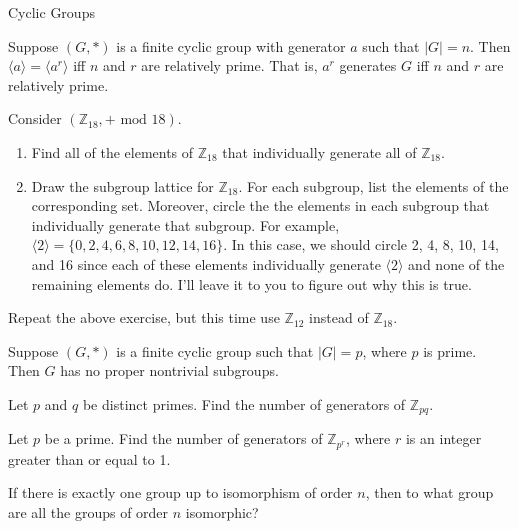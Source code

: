 \begin{section}{Cyclic Groups}
\begin{corollary}
Suppose $(G,*)$ is a finite cyclic group with generator $a$ such that $|G|=n$. Then $\langle a\rangle=\langle a^r\rangle$ iff $n$ and $r$ are relatively prime. That is, $a^r$ generates $G$ iff $n$ and $r$ are relatively prime.
\end{corollary}

\begin{exercise}
Consider $(\mathbb{Z}_{18},+\text{ mod }18)$.
\begin{enumerate}[label=\rm{(\alph*)}]
\item Find all of the elements of $\mathbb{Z}_{18}$ that individually generate all of $\mathbb{Z}_{18}$.
\item Draw the subgroup lattice for $\mathbb{Z}_{18}$. For each subgroup, list the elements of the corresponding set.  Moreover, circle the the elements in each subgroup that individually generate that subgroup.  For example, $\langle 2\rangle=\{0,2,4,6,8,10,12,14,16\}$. In this case, we should circle 2, 4, 8, 10, 14, and 16 since each of these elements individually generate $\langle 2\rangle$ and none of the remaining elements do.  I'll leave it to you to figure out why this is true.
\end{enumerate}
\end{exercise}

\begin{exercise}
Repeat the above exercise, but this time use $\mathbb{Z}_{12}$ instead of $\mathbb{Z}_{18}$.
\end{exercise}

\begin{corollary}
Suppose $(G,*)$ is a finite cyclic group such that $|G|=p$, where $p$ is prime. Then $G$ has no proper nontrivial subgroups.
\end{corollary}

\begin{problem}
Let $p$ and $q$ be distinct primes. Find the number of generators of $\mathbb{Z}_{pq}$.
\end{problem}

\begin{problem}
Let $p$ be a prime. Find the number of generators of $\mathbb{Z}_{p^r}$, where $r$ is an integer greater than or equal to 1.
\end{problem}

\begin{problem}
If there is exactly one group up to isomorphism of order $n$, then to what group are all the groups of order $n$ isomorphic?
\end{problem}

\end{section}


